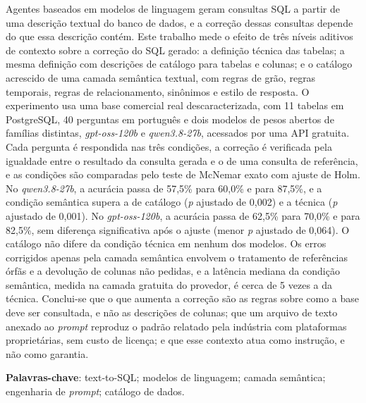 \setlength{\absparsep}{18pt}
\begin{resumo}
  Agentes baseados em modelos de linguagem geram consultas SQL a partir de
  uma descrição textual do banco de dados, e a correção dessas consultas
  depende do que essa descrição contém. Este trabalho mede o efeito de
  três níveis aditivos de contexto sobre a correção do SQL gerado: a
  definição técnica das tabelas; a mesma definição com descrições de
  catálogo para tabelas e colunas; e o catálogo acrescido de uma camada
  semântica textual, com regras de grão, regras temporais, regras de
  relacionamento, sinônimos e estilo de resposta. O experimento usa uma
  base comercial real descaracterizada, com 11 tabelas em PostgreSQL, 40
  perguntas em português e dois modelos de pesos abertos de famílias
  distintas, \textit{gpt-oss-120b} e \textit{qwen3.8-27b}, acessados por
  uma API gratuita. Cada pergunta é respondida nas três condições, a
  correção é verificada pela igualdade entre o resultado da consulta
  gerada e o de uma consulta de referência, e as condições são comparadas
  pelo teste de McNemar exato com ajuste de Holm. No
  \textit{qwen3.8-27b}, a acurácia passa de 57,5\% para 60,0\% e para
  87,5\%, e a condição semântica supera a de catálogo (\textit{p} ajustado
  de 0,002) e a técnica (\textit{p} ajustado de 0,001). No
  \textit{gpt-oss-120b}, a acurácia passa de 62,5\% para 70,0\% e para
  82,5\%, sem diferença significativa após o ajuste (menor \textit{p}
  ajustado de 0,064). O catálogo não difere da condição técnica em nenhum
  dos modelos. Os erros corrigidos apenas pela camada semântica envolvem o
  tratamento de referências órfãs e a devolução de colunas não pedidas, e
  a latência mediana da condição semântica, medida na camada gratuita do
  provedor, é cerca de 5 vezes a da técnica. Conclui-se que o que aumenta a correção são as regras sobre
  como a base deve ser consultada, e não as descrições de colunas; que um
  arquivo de texto anexado ao \textit{prompt} reproduz o padrão relatado
  pela indústria com plataformas proprietárias, sem custo de licença; e
  que esse contexto atua como instrução, e não como garantia.

  \vspace{\onelineskip}
  \noindent\textbf{Palavras-chave}: text-to-SQL; modelos de linguagem;
  camada semântica; engenharia de \textit{prompt}; catálogo de dados.
\end{resumo}
